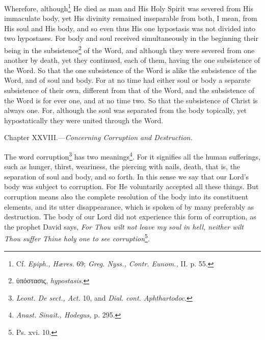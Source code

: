 Wherefore, although\footnote{Cf. \emph{Epiph., Hæres. }69; \emph{Greg. Nyss., Contr. Eunom., }II. p. 55.} He died as man and His Holy Spirit was severed from His immaculate body, yet His divinity remained inseparable from both, I mean, from His soul and His body, and so even thus His one hypostasis was not divided into two hypostases. For body and soul received simultaneously in the beginning their being in the subsistence\footnote{\textgreek{ὑπόστασις}, \emph{hypostasis}.} of the Word, and although they were severed from one another by death, yet they continued, each of them, having the one subsistence of the Word. So that the one subsistence of the Word is alike the subsistence of the Word, and of soul and body. For at no time had either soul or body a separate subsistence of their own, different from that of the Word, and the subsistence of the Word is for ever one, and at no time two. So that the subsistence of Christ is always one. For, although the soul was separated from the body topically, yet hypostatically they were united through the Word.


Chapter XXVIII.—\emph{Concerning Corruption and Destruction.}

The word corruption\footnote{\emph{Leont. De sect., Act. }10, and \emph{Dial. cont. Aphthartodoc}.} has two meanings\footnote{\emph{Anast. Sinait., Hodegus, }p. 295.}. For it signifies all the human sufferings, such as hunger, thirst, weariness, the piercing with nails, death, that is, the separation of soul and body, and so forth. In this sense we say that our Lord’s body was subject to corruption. For He voluntarily accepted all these things. But corruption means also the complete resolution of the body into its constituent elements, and its utter disappearance, which is spoken of by many preferably as destruction. The body of our Lord did not experience this form of corruption, as the prophet David says, \emph{For Thou wilt not leave my soul in hell, neither wilt Thou suffer Thine holy one to see corruption}\footnote{Ps. xvi. 10.}.

